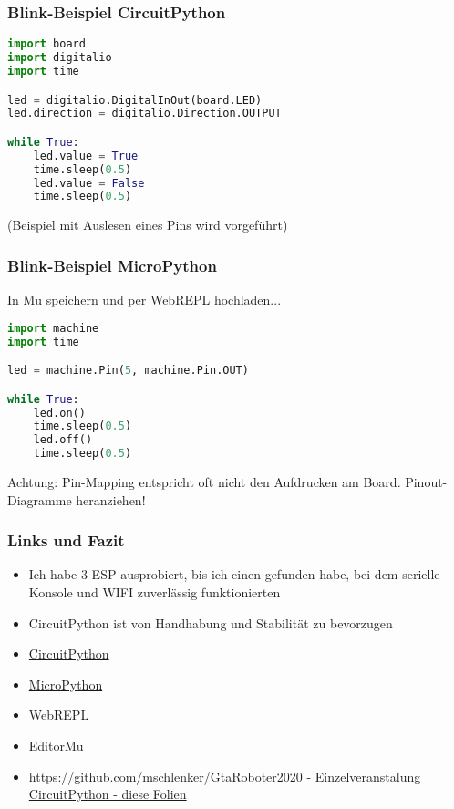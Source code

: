 \documentclass{beamer}
\begin{document}
\begin{frame}[fragile]

\frametitle{Blink-Beispiel CircuitPython}

\begin{lstlisting}[language=Python] 
import board
import digitalio
import time

led = digitalio.DigitalInOut(board.LED)
led.direction = digitalio.Direction.OUTPUT

while True:
    led.value = True
    time.sleep(0.5)
    led.value = False
    time.sleep(0.5)

\end{lstlisting} 

(Beispiel mit Auslesen eines Pins wird vorgeführt)

\end{frame}

\begin{frame}[fragile]

\frametitle{Blink-Beispiel MicroPython}

In Mu speichern und per WebREPL hochladen...

\begin{lstlisting}[language=Python] 
import machine
import time

led = machine.Pin(5, machine.Pin.OUT)

while True:
    led.on()
    time.sleep(0.5)
    led.off()
    time.sleep(0.5)

\end{lstlisting} 

Achtung: Pin-Mapping entspricht oft nicht den Aufdrucken am Board. Pinout-Diagramme heranziehen!

\end{frame}

\begin{frame}[fragile]
\frametitle{Links und Fazit}

\begin{itemize}
\item Ich habe 3 ESP ausprobiert, bis ich einen gefunden habe, bei dem serielle Konsole und WIFI zuverlässig funktionierten
\item CircuitPython ist von Handhabung und Stabilität zu bevorzugen
\item \href{https://circuitpython.org}{CircuitPython}
\item \href{https://micropython.org}{MicroPython}
\item \href{http://micropython.org/webrepl/}{WebREPL}
\item \href{https://codewith.mu/}{EditorMu}
\item \href{https://github.com/mschlenker/GtaRoboter2020/tree/master/Einzelveranstaltung\_Circuitpython}{https://github.com/mschlenker/GtaRoboter2020 - Einzelveranstalung CircuitPython - diese Folien}
\end{itemize}

\end{frame}
\end{document}
